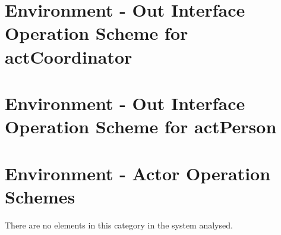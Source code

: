 \section{Environment - Out Interface Operation Scheme for actCoordinator}
\label{OM-EM-OutInterface-OS-actCoordinator}












\section{Environment - Out Interface Operation Scheme for actPerson}
\label{OM-EM-OutInterface-OS-actPerson}






\section{Environment - Actor Operation Schemes}
There are no elements in this category in the system analysed.
		



